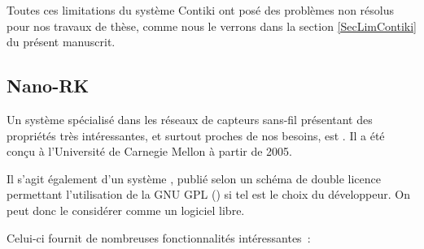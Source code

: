 Toutes ces limitations du système Contiki ont posé des problèmes
non résolus pour nos travaux de thèse, comme nous le verrons dans
la section \vref{SecLimContiki} du présent manuscrit.


\subsection{Nano-RK}
\label{SubsecNanoRK}

Un système spécialisé dans les réseaux de capteurs sans-fil présentant
des propriétés très intéressantes, et surtout proches de nos besoins, est
 \cite{NanoRK}. Il a été conçu à l'Université de Carnegie
Mellon à partir de 2005.

Il s'agit également d'un système , publié selon un schéma
de double licence permettant l'utilisation de la GNU GPL () si tel est le choix du développeur. On peut donc le
considérer comme un logiciel libre.

Celui-ci fournit de nombreuses fonctionnalités intéressantes~:

